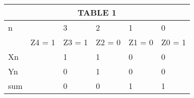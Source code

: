 \documentclass{article}
\begin{document}
\begin{tabular}{ |p{1cm}|p{1cm}|p{1cm}|p{1cm}|p{1cm}|p{1cm}| }
\hline
\multicolumn{6}{|c|}{TABLE 1} \\
\hline
n &  & 3 & 2 & 1 & 0\\
\hline
  & Z4 = 1 & Z3 = 1 & Z2 = 0 & Z1 = 0 & Z0 = 1 \\
\hline
Xn &  & 1 & 1 & 0 & 0  \\
\hline
Yn &  & 0 & 1 & 0 & 0 \\
\hline
sum & & 0 & 0 & 1 & 1 \\

\hline

\end{tabular}
\end{document}
